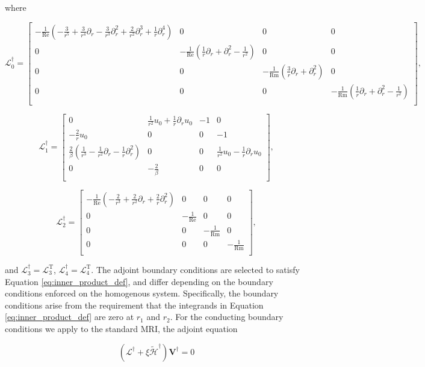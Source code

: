 \documentclass{emulateapj}
\newcommand{\beq}{\begin{equation}}
\newcommand{\eeq}{\end{equation}}
\newcommand\reye{\mathrm{Re}}
\newcommand\reym{\mathrm{Rm}}
\begin{document}
where 

\beq
\mathcal{L}_0^\dagger = \left[\begin{matrix}
-\frac{1}{\reye} (-\frac{3}{r^5} + \frac{3}{r^4}\partial_r - \frac{3}{r^3} \partial_r^2 + \frac{2}{r^2}\partial_r^3 + \frac{1}{r}\partial_r^4 ) & 0 & 0 & 0 \\
0 & -\frac{1}{\reye} (\frac{1}{r}\partial_r + \partial_r^2 - \frac{1}{r^2}) & 0 & 0 \\
0 & 0 &-\frac{1}{\reym} (\frac{3}{r}\partial_r + \partial_r^2) & 0 \\
0 & 0 & 0 & -\frac{1}{\reym} (\frac{1}{r}\partial_r + \partial_r^2 - \frac{1}{r^2}) \\
\end{matrix}\right],
\eeq

\beq
\mathcal{L}_1^\dagger = \left[\begin{matrix}
0 & \frac{1}{r^2} u_0 + \frac{1}{r}\partial_r u_0 & -1 & 0 \\
-\frac{2}{r}u_0 & 0 & 0 & -1 \\
\frac{2}{\beta}(\frac{1}{r^3} - \frac{1}{r^2}\partial_r - \frac{1}{r}\partial_r^2) & 0 & 0 & \frac{1}{r^2}u_0 - \frac{1}{r}\partial_r u_0 \\
0 & -\frac{2}{\beta} & 0 & 0 \\
\end{matrix}\right],
\eeq

\beq
\mathcal{L}_2^\dagger = \left[\begin{matrix}
-\frac{1}{\reye}(-\frac{2}{r^3} + \frac{2}{r^2}\partial_r + \frac{2}{r}\partial_r^2) & 0 & 0 & 0 \\
0 & -\frac{1}{\reye} & 0 & 0 \\
0 & 0 & -\frac{1}{\reym} & 0 \\
0 & 0 & 0 & -\frac{1}{\reym} \\
\end{matrix}\right],
\eeq

and $\mathcal{L}_3^\dagger = \mathcal{L}_3^\mathrm{T}$, $\mathcal{L}_4^\dagger = \mathcal{L}_4^\mathrm{T}$. The adjoint boundary conditions are selected to satisfy Equation \ref{eq:inner_product_def}, and differ depending on the boundary conditions enforced on the homogenous system. Specifically, the boundary conditions arise from the requirement that the integrands in Equation \ref{eq:inner_product_def} are zero at $r_1$ and $r_2$. For the conducting boundary conditions we apply to the standard MRI, the adjoint equation 

\beq\label{eq:adjoint}
(\mathcal{L}^\dagger + \xi \widetilde{\mathcal{H}}^\dagger)\mathbf{V}^\dagger = 0
\eeq
\end{document}

